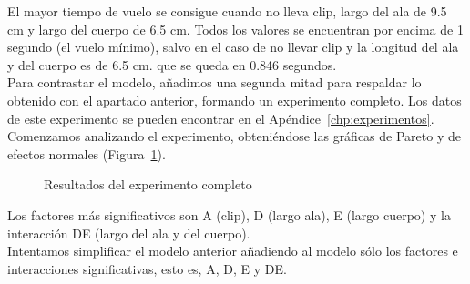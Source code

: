 \documentclass[12pt,a4paper,twoside,openright,titlepage,final]{article}
\begin{document}
El mayor tiempo de vuelo se consigue cuando no lleva clip, largo del ala de 9.5 cm y largo del cuerpo de 6.5 cm. Todos los valores se encuentran por encima de 1 segundo (el vuelo mínimo), salvo en el caso de no llevar clip y la longitud del ala y del cuerpo es de 6.5 cm. que se queda en 0.846 segundos.\\

Para contrastar el modelo, añadimos una segunda mitad para respaldar lo obtenido con el apartado anterior, formando un experimento completo.  Los datos de este experimento se pueden encontrar en el Apéndice~\ref{chp:experimentos}.\\

Comenzamos analizando el experimento, obteniéndose las gráficas de Pareto y de efectos normales (Figura~\ref{fig:resultado_experimento_completo_1}).\\

\begin{figure}[htbp!]
	\centering
	\caption{Resultados del experimento completo} \label{fig:resultado_experimento_completo_1}
\end{figure}

Los factores más significativos son A (clip), D (largo ala), E (largo cuerpo) y la interacción DE (largo del ala y del cuerpo).\\

Intentamos simplificar el modelo anterior añadiendo al modelo sólo los factores e interacciones significativas, esto es, A, D, E y DE.\\
\end{document}
